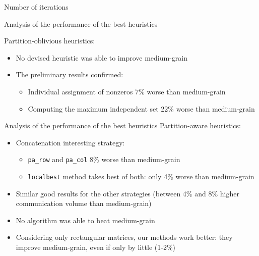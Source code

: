 \begin{frame}{Number of iterations}
{\begin{figure}[h]
		\end{figure}
	}
\end{frame}

\begin{frame}{Analysis of the performance of the best heuristics}

	Partition-oblivious heuristics:

\begin{itemize}\itemsep=0.4cm
		\item No devised heuristic was able to improve medium-grain
		\item The preliminary results confirmed:

		\begin{itemize}\itemsep=0.3cm
				\item Individual assignment of nonzeros 7\% worse than medium-grain
				\item Computing the maximum independent set 22\% worse than medium-grain
			\end{itemize}
	\end{itemize}
\end{frame}

\begin{frame}{Analysis of the performance of the best heuristics}
	Partition-aware heuristics:

	\begin{itemize}
		\item Concatenation interesting strategy:
			\begin{itemize}
				\item \texttt{pa\_row} and \texttt{pa\_col} 8\% worse than medium-grain
				\item \texttt{localbest} method takes best of both: only 4\% worse than medium-grain 
			\end{itemize}
		\item Similar good results for the other strategies (between 4\% and 8\% higher communication volume than medium-grain)
		\item No algorithm was able to beat medium-grain
		\item Considering only rectangular matrices, our methods work better: they improve medium-grain, even if only by little (1-2\%)
	\end{itemize}
\end{frame}


